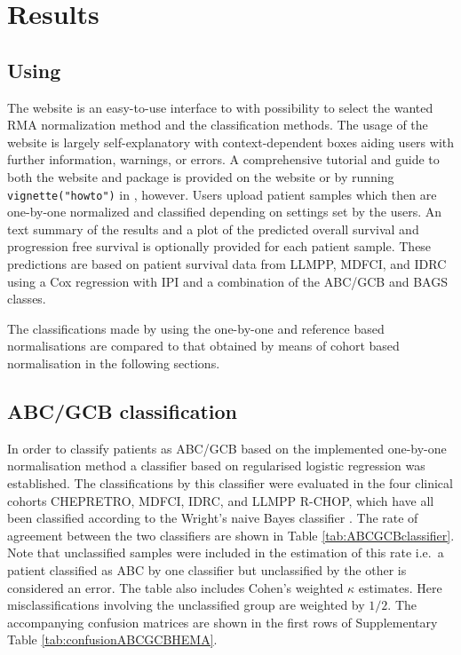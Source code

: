 \documentclass{article}
\begin{document}
\section{Results}
\subsection{Using \hemaClass{}}
The website is an easy-to-use interface to  with possibility to select the wanted RMA normalization method and the classification methods.
The usage of the website is largely self-explanatory with context-dependent boxes aiding users with further information, warnings, or errors.
A comprehensive tutorial and guide to both the website and package is provided on the website or by running \texttt{vignette("howto")} in \R{}, however.
Users upload patient samples which then are one-by-one normalized and classified depending on settings set by the users.
An text summary of the results and a plot of the predicted overall survival and progression free survival is optionally provided for each patient sample.
These predictions are based on patient survival data from LLMPP, MDFCI, and IDRC using a Cox regression with IPI and a combination of the ABC/GCB and BAGS classes.

The classifications made by \hemaClass{} using the one-by-one and reference based normalisations are compared to that obtained by means of cohort based normalisation in the following sections.


\subsection{ABC/GCB classification}
In order to classify patients as ABC/GCB based on the implemented one-by-one normalisation method a classifier based on regularised logistic regression was established.
The classifications by this classifier were evaluated in the four clinical cohorts CHEPRETRO, MDFCI, IDRC, and LLMPP R-CHOP, which have all been classified according to the Wright's naive Bayes classifier \citep{Wright2003,Lenz2008a}.
The rate of agreement between the two classifiers are shown in Table \ref{tab:ABCGCBclassifier}.
Note that unclassified samples were included in the estimation of this rate i.e.\ a patient classified as ABC by one classifier but unclassified by the other is considered an error.
The table also includes Cohen's weighted $\kappa$ estimates.
Here misclassifications involving the unclassified group are weighted by $1/2$.
The accompanying confusion matrices are shown in the first rows of Supplementary Table \ref{tab:confusionABCGCBHEMA}.
\end{document}
